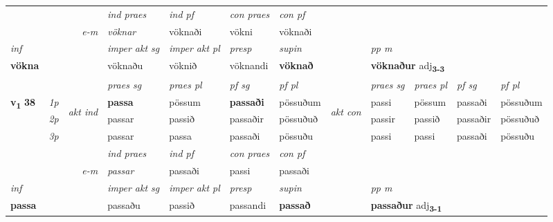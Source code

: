 \begin{longtable}[l]{X>{\footnotesize\itshape}llXXXXlXXXX}
   && &  \textit{ind praes} & \textit{ind pf} & \textit{con praes} & \textit{con pf} \\*
\multicolumn{3}{r}{\textit{e-m}} & vöknar & vöknaði & vökni & vöknaði \\*

\cmidrule{4-7}
   {\textit{inf}} & &  & \textit{imper akt sg} & \textit{imper akt pl}   & \textit{presp} & \textit{supin}  && \textit{pp m} \\*
  {\textbf{vökna}} & && vöknaðu  & vöknið   & vöknandi &  \textbf{vöknað}  && \multicolumn{2}{l}{\textbf{vöknaður} adj\textbf{\textsubscript{3-3}}} \\*

\midrule

 & &   & \textit{praes sg}  & \textit{praes pl}    & \textit{ pf sg} & \textit{pf pl} & & \textit{praes sg}  & \textit{praes pl}    & \textit{pf sg} & \textit{pf pl }  \\ \cmidrule{4-7} \cmidrule{9-12}
 \multirow{2}{*}{{{\textbf{v{\textsubscript{1}}} \Large{\textbf{38}}}}}  & 1p & \multirow{3}{*}{\begin{turn}{90}\textit{akt ind}\end{turn}} & \textbf{passa} & pössum & \textbf{passaði} & pössuðum & \multirow{3}{*}{\begin{turn}{90}\textit{akt con}\end{turn}} &passi & pössum & passaði & pössuðum\\*
 & 2p &  &  passar  & passið & passaðir & pössuðuð & & passir & passið & passaðir & pössuðuð \\*
 & 3p &  & passar & passa & passaði & pössuðu & & passi & passi& passaði & pössuðu \\*
\cmidrule{4-7} \cmidrule{9-12}

   && &  \textit{ind praes} & \textit{ind pf} & \textit{con praes} & \textit{con pf} \\*
\multicolumn{3}{r}{\textit{e-m}} & passar & passaði & passi & passaði \\*

\cmidrule{4-7}
   {\textit{inf}} & &  & \textit{imper akt sg} & \textit{imper akt pl}   & \textit{presp} & \textit{supin}  && \textit{pp m} \\*
  {\textbf{passa}} & && passaðu  & passið   & passandi &  \textbf{passað}  && \multicolumn{2}{l}{\textbf{passaður} adj\textbf{\textsubscript{3-1}}} \\*

\midrule


\end{longtable}
